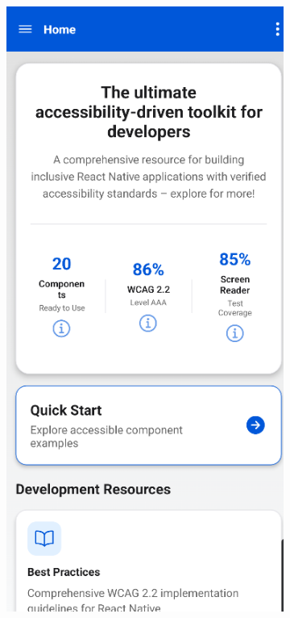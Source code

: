 \begin{figure}[ht]
    \centering
    \begin{subfigure}[b]{0.44\textwidth}
        \centering
        \includegraphics[width=\linewidth, alt={First part of the Home screen}]{img/home1.png}

\end{subfigure}
\end{figure}
